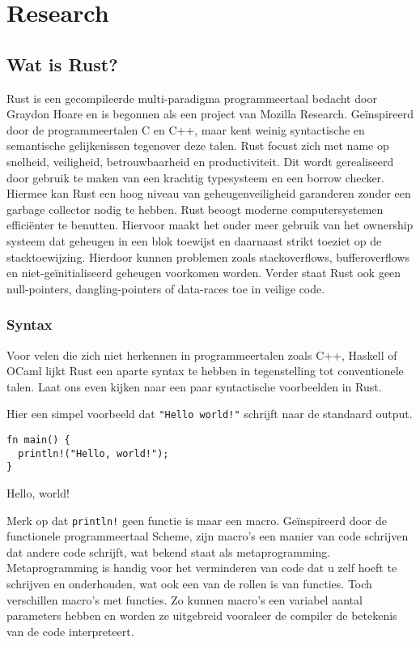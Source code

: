\chapter{Research}

\section{Wat is Rust?}

Rust is een gecompileerde multi-paradigma programmeertaal bedacht door Graydon Hoare en is begonnen
als een project van Mozilla Research. Geïnspireerd door de programmeertalen C en C++, maar kent
weinig syntactische en semantische gelijkenissen tegenover deze talen. Rust focust zich met name op
snelheid, veiligheid, betrouwbaarheid en productiviteit. Dit wordt gerealiseerd door gebruik te
maken van een krachtig typesysteem en een borrow checker. Hiermee kan Rust een hoog niveau van
geheugenveiligheid garanderen zonder een garbage collector nodig te hebben. Rust beoogt moderne
computersystemen efficiënter te benutten. Hiervoor maakt het onder meer gebruik van het ownership
systeem dat geheugen in een blok toewijst en daarnaast strikt toeziet op de stacktoewijzing.
Hierdoor kunnen problemen zoals stackoverflows, bufferoverflows en niet-geïnitialiseerd geheugen
voorkomen worden. Verder staat Rust ook geen null-pointers, dangling-pointers of data-races toe in
veilige code.

\subsection{Syntax} 

Voor velen die zich niet herkennen in programmeertalen zoals C++, Haskell of OCaml lijkt Rust een
aparte syntax te hebben in tegenstelling tot conventionele talen. Laat ons even kijken naar een paar
syntactische voorbeelden in Rust.


Hier een simpel voorbeeld dat \texttt{"Hello world!"} schrijft naar de standaard output.

\begin{listing}[h]
\begin{verbatim}
fn main() {
  println!("Hello, world!");
}
\end{verbatim}
\caption{Hello, world!}
\end{listing}

\clearpage

Merk op dat \texttt{println!} geen functie is maar een macro. Geïnspireerd door de
functionele programmeertaal Scheme, zijn macro’s een manier van code schrijven dat andere code
schrijft, wat bekend staat als metaprogramming. Metaprogramming is handig voor het verminderen van
code dat u zelf hoeft te schrijven en onderhouden, wat ook een van de rollen is van functies. Toch
verschillen macro’s met functies. Zo kunnen macro’s een variabel aantal parameters hebben en worden
ze uitgebreid vooraleer de compiler de betekenis van de code interpreteert.


